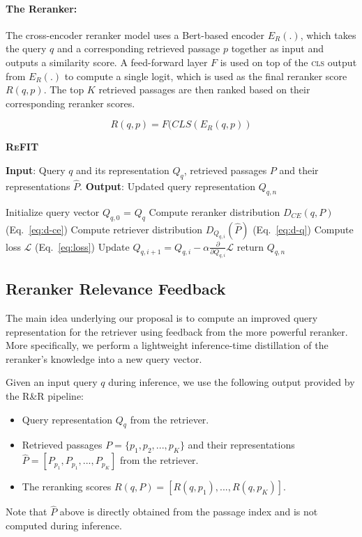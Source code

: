 \paragraph{\textbf{The Reranker}:} The cross-encoder reranker model uses a Bert-based encoder $E_R(.)$, which takes the query $q$ and a corresponding retrieved passage $p$ together as input and outputs a similarity score. 
A feed-forward layer $F$ is used on top of the \textsc{cls} output from $E_R(.)$ to compute a single logit, which is used as the final reranker score $R(q,p)$. The top $K$ retrieved passages are then ranked based on their corresponding reranker scores.

\begin{equation}
   R(q,p) = F(CLS(E_R(q,p))
\end{equation}


\begin{algorithm}[t]
\caption{\textsc{\textbf{ReFIT}}}
\label{alg4}
\begin{flushleft}
\textbf{Input}: Query $q$ and its representation $Q_q$, retrieved passages $P$ and their representations $\hat{P}$.\newline
\textbf{Output}: Updated query representation $Q_{q,n}$
\end{flushleft}
\begin{algorithmic}[1]
    \State Initialize query vector $Q_{q,0}$ = $Q_q$
    \State Compute reranker distribution $D_{CE}(q,P)$ (Eq.~\ref{eq:d-ce})
        \State Compute retriever distribution $D_{Q_{q,i}}(\hat{P})$ (Eq.~\ref{eq:d-q})
        \State Compute loss $\mathcal{L}$ (Eq.~\ref{eq:loss})
        \State Update $Q_{q,i+1} = Q_{q,i} - \alpha \frac{\partial}{\partial Q_{q,i}}\mathcal{L}$
    \EndFor
    \State return $Q_{q,n}$
\end{algorithmic}
\end{algorithm}

\subsection{Reranker Relevance Feedback}
\label{sec:cross_encoder_feedback}
The main idea underlying our proposal is to compute an improved query representation for the retriever using feedback from the more powerful reranker.
More specifically, we perform a lightweight inference-time distillation of the reranker's knowledge into a new query vector.

Given an input query $q$ during inference, we use the following output provided by the R\&R pipeline:
\begin{itemize}
   \item Query representation $Q_q$ from the retriever.
    \item Retrieved passages $P = \{p_1, p_2,  ..., p_K\}$ and their representations $\hat{P} = [P_{p_1}, P_{p_1},  ..., P_{p_K}]$ from the retriever. 
    \item The reranking scores $R(q,P) = [R(q,p_1),..., R(q,p_K)]$.
\end{itemize}
Note that $\hat{P}$ above is directly obtained from the passage index and is not computed during inference.

